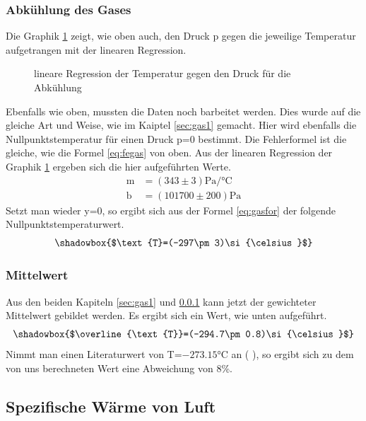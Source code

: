 \documentclass[12pt,a4paper,titlepage,headinclude,bibtotoc]{scrartcl}
\begin{document}
\subsubsection{Abkühlung des Gases}
\label{sec:gas2}
Die Graphik \ref{fig:gas2} zeigt, wie oben auch, den Druck p gegen die jeweilige Temperatur aufgetrangen mit der linearen Regression.
\begin{figure}[!h]
\centering

\caption{lineare Regression der Temperatur gegen den Druck für die Abkühlung}
\label{fig:gas2}
\end{figure}
Ebenfalls wie oben, mussten die Daten noch barbeitet werden.
Dies wurde auf die gleiche Art und Weise, wie im Kaiptel \ref{sec:gas1} gemacht.
Hier wird ebenfalls die Nullpunktstemperatur für einen Druck p=0 bestimmt.
Die Fehlerformel ist die gleiche, wie die Formel \eqref{eq:fegas} von oben.
Aus der linearen Regression der Graphik \ref{fig:gas2} ergeben sich die hier aufgeführten Werte.
\begin{align}
	\text{m} &= (343\pm3)\si{\pascal/\celsius}\\
	\text{b} &= (101700\pm200)\si{\pascal}
\end{align}
Setzt man wieder y=0, so ergibt sich aus der Formel \eqref{eq:gasfor} der folgende Nullpunktstemperaturwert.
$$\shadowbox{$\text{T}=(-297\pm3)\si{\celsius}$}$$

\subsubsection{Mittelwert}
Aus den beiden Kapiteln \ref{sec:gas1} und \ref{sec:gas2} kann jetzt der gewichteter Mittelwert gebildet werden.
Es ergibt sich ein Wert, wie unten aufgeführt.
$$\shadowbox{$\overline{\text{T}}=(-294.7\pm0.8)\si{\celsius}$}$$
Nimmt man einen Literaturwert von T=$-273.15\si{\celsius}$ an (\cite[S. 73]{prakti} ), so ergibt sich zu dem von uns berechneten Wert eine Abweichung von 8\%.

\subsection{Spezifische Wärme von Luft}
\end{document}
